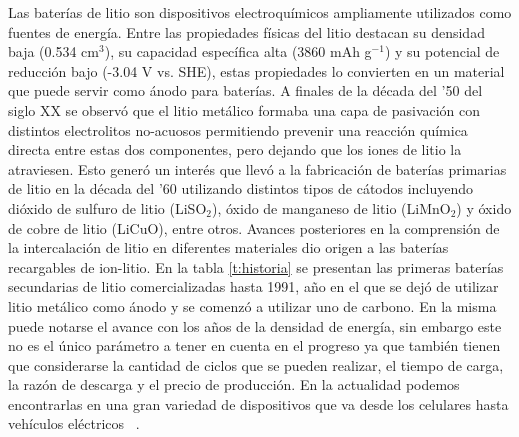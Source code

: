 Las baterías de litio son dispositivos electroquímicos ampliamente utilizados 
como fuentes de energía. Entre las propiedades físicas del litio destacan su 
densidad baja (0.534 cm$^3$), su capacidad específica alta (3860 mAh g$^{-1}$) y
su potencial de reducción bajo (-3.04 V vs. SHE), estas propiedades lo convierten
en un material que puede servir como ánodo para baterías. A finales de la década
del '50 del siglo XX se observó que el litio metálico formaba una capa de 
pasivación con distintos electrolitos no-acuosos permitiendo prevenir una 
reacción química directa entre estas dos componentes, pero dejando que los iones 
de litio la atraviesen. Esto generó un interés que llevó a la fabricación de 
baterías primarias de litio en la década del '60 utilizando distintos tipos de 
cátodos incluyendo dióxido de sulfuro de litio (LiSO$_2$), óxido de manganeso de 
litio (LiMnO$_2$) y óxido de cobre de litio (LiCuO), entre otros. Avances 
posteriores en la comprensión de la intercalación de litio en diferentes 
materiales dio origen a las baterías recargables de ion-litio. En la tabla 
\ref{t:historia} se presentan las primeras baterías secundarias de litio 
comercializadas hasta 1991, año en el que se dejó de utilizar litio metálico como
ánodo y se comenzó a utilizar uno de carbono. En la misma puede notarse el avance 
con los años de la densidad de energía, sin embargo este no es el único parámetro 
a tener en cuenta en el progreso ya que también tienen que considerarse la 
cantidad de ciclos que se pueden realizar, el tiempo de carga, la razón de 
descarga y el precio de producción. En la actualidad podemos encontrarlas en una 
gran variedad de dispositivos que va desde los celulares hasta vehículos 
eléctricos ~\cite{reddy2020}. 
